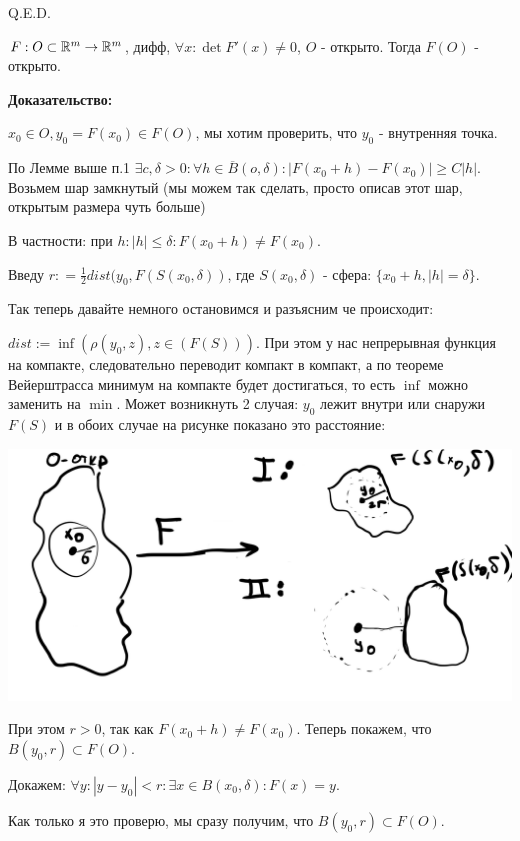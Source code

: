 \hfill Q.E.D.


$F: O\subset \mathbb{R}^m \rightarrow \mathbb{R}^m$, дифф, $\forall x : \det F'(x) \neq 0$, $O$  - открыто. Тогда $F(O)$ - открыто.

\textbf{Доказательство:}

$x_0 \in O, y_0 = F(x_0) \in F(O)$, мы хотим проверить, что $y_0$ - внутренняя точка.

По Лемме выше п.1 $\exists c,\delta >0: \forall h \in \overline{B}(o,\delta): |F(x_0+h) -F(x_0)| \geq C|h| $. Возьмем шар замкнутый (мы можем так сделать, просто описав этот шар, открытым размера чуть больше)

В частности: при $h:|h| \leq \delta :  F(x_0 + h)\neq F(x_0)$.

Введу $r: = \frac{1}{2}dist (y_0, F(S(x_0,\delta))$, где $S(x_0,\delta)$ - сфера: $\{x_0 + h, |h| = \delta\}$.

Так теперь давайте немного остановимся и разъясним че происходит:

$dist := \inf (\rho(y_0, z), z \in (F(S)))$. При этом у нас непрерывная  функция на компакте, следовательно переводит компакт в компакт, а по теореме Вейерштрасса минимум на компакте будет достигаться, то есть $\inf$ можно заменить на $\min$. Может возникнуть 2 случая: $y_0$ лежит внутри или снаружи $F(S)$ и в обоих случае на рисунке показано это расстояние:
\begin{center}
   \includegraphics[width=14cm]{assets/block_hard_1.png}
\end{center}
При этом $r > 0$, так как $F(x_0+h) \neq F(x_0)$. Теперь покажем, что $B(y_0,r) \subset  F(O)$.

Докажем: $\forall y: |y-y_0|<r: \exists x\in B(x_0,\delta): F(x) = y$. 

Как только я это проверю, мы сразу получим, что $B(y_0,r) \subset  F(O)$.

